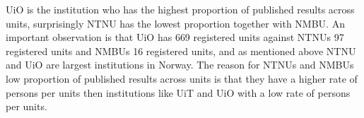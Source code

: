 UiO is the institution who has the highest proportion of published results across units, surprisingly NTNU has the lowest proportion together with NMBU. An important observation is that UiO has 669 registered units against NTNUs 97 registered units and NMBUs 16 registered units, and as mentioned above NTNU and UiO are largest institutions in Norway. The reason for NTNUs and NMBUs low proportion of published results across units is that they have a higher rate of persons per units then institutions like UiT and UiO with a low rate of persons per units.
